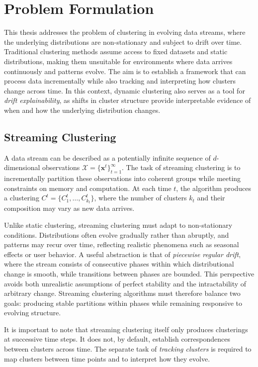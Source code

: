 \section{Problem Formulation}\label{sec:problem_formulation}

This thesis addresses the problem of clustering in evolving data streams, where
the underlying distributions are non-stationary and subject to drift over time.
Traditional clustering methods assume access to fixed datasets and static
distributions, making them unsuitable for environments where data arrives
continuously and patterns evolve. The aim is to establish a framework that can
process data incrementally while also tracking and interpreting how clusters
change across time. In this context, dynamic clustering also serves as a tool
for \emph{drift explainability}, as shifts in cluster structure provide
interpretable evidence of when and how the underlying distribution changes.

\subsection{Streaming Clustering}\label{subsec:prob_streaming_clustering}

A data stream can be described as a potentially infinite sequence of
$d$-dimensional observations $\mathcal{X}=\{\mathbf{x}^t\}_{t=1}^{\infty}$. The
task of streaming clustering is to incrementally partition these observations
into coherent groups while meeting constraints on memory and computation. At
each time $t$, the algorithm produces a clustering
$C^t=\{C_1^t,\dots,C_{k_t}^t\}$, where the number of clusters $k_t$ and their
composition may vary as new data arrives.

Unlike static clustering, streaming clustering must adapt to non-stationary
conditions. Distributions often evolve gradually rather than abruptly, and
patterns may recur over time, reflecting realistic phenomena such as seasonal
effects or user behavior. A useful abstraction is that of \emph{piecewise
    regular drift}, where the stream consists of consecutive phases within which
distributional change is smooth, while transitions between phases are bounded.
This perspective avoids both unrealistic assumptions of perfect stability and
the intractability of arbitrary change. Streaming clustering algorithms must
therefore balance two goals: producing stable partitions within phases while
remaining responsive to evolving structure.

It is important to note that streaming clustering itself only produces
clusterings at successive time steps. It does not, by default, establish
correspondences between clusters across time. The separate task of
\emph{tracking clusters} is required to map clusters between time points and to
interpret how they evolve.

